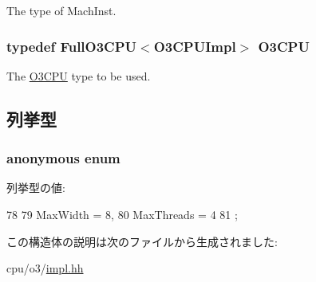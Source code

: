 \label{structO3CPUImpl_a4617f528417b8f55f809ae0988284c9b}
The type of MachInst. \hypertarget{structO3CPUImpl_ae2d319b803b8c735fdf7908491224280}{
\subsubsection[{O3CPU}]{\setlength{\rightskip}{0pt plus 5cm}typedef {\bf FullO3CPU}$<${\bf O3CPUImpl}$>$ {\bf O3CPU}}}
\label{structO3CPUImpl_ae2d319b803b8c735fdf7908491224280}
The \hyperlink{namespaceO3CPU}{O3CPU} type to be used. 

\subsection{列挙型}
\hypertarget{structO3CPUImpl_a96a58e29e8dbf2b5bdeb775cba46556e}{
\subsubsection[{"@34}]{\setlength{\rightskip}{0pt plus 5cm}anonymous enum}}
\label{structO3CPUImpl_a96a58e29e8dbf2b5bdeb775cba46556e}
\begin{Desc}
\item[列挙型の値: ]\par
\begin{description}
\item[{\em 
\hypertarget{structO3CPUImpl_a96a58e29e8dbf2b5bdeb775cba46556eaccb4dfe1c6060f0571b5d9685f402134}{
MaxWidth}
\label{structO3CPUImpl_a96a58e29e8dbf2b5bdeb775cba46556eaccb4dfe1c6060f0571b5d9685f402134}
}]\item[{\em 
\hypertarget{structO3CPUImpl_a96a58e29e8dbf2b5bdeb775cba46556eab491ddc45d51d0ea7f735c1926390fdb}{
MaxThreads}
\label{structO3CPUImpl_a96a58e29e8dbf2b5bdeb775cba46556eab491ddc45d51d0ea7f735c1926390fdb}
}]\end{description}
\end{Desc}




\begin{DoxyCode}
78          {
79       MaxWidth = 8,
80       MaxThreads = 4
81     };
\end{DoxyCode}


この構造体の説明は次のファイルから生成されました:\begin{DoxyCompactItemize}
\item 
cpu/o3/\hyperlink{impl_8hh}{impl.hh}\end{DoxyCompactItemize}
